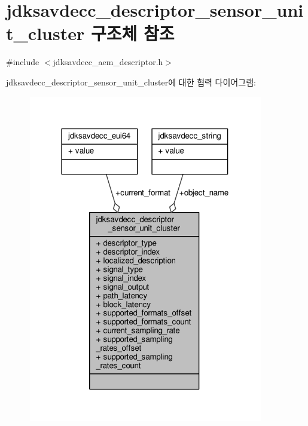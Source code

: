 \hypertarget{structjdksavdecc__descriptor__sensor__unit__cluster}{}\section{jdksavdecc\+\_\+descriptor\+\_\+sensor\+\_\+unit\+\_\+cluster 구조체 참조}
\label{structjdksavdecc__descriptor__sensor__unit__cluster}


{\ttfamily \#include $<$jdksavdecc\+\_\+aem\+\_\+descriptor.\+h$>$}



jdksavdecc\+\_\+descriptor\+\_\+sensor\+\_\+unit\+\_\+cluster에 대한 협력 다이어그램\+:
\nopagebreak
\begin{figure}[H]
\begin{center}
\leavevmode
\includegraphics[width=290pt]{structjdksavdecc__descriptor__sensor__unit__cluster__coll__graph}
\end{center}
\end{figure}

